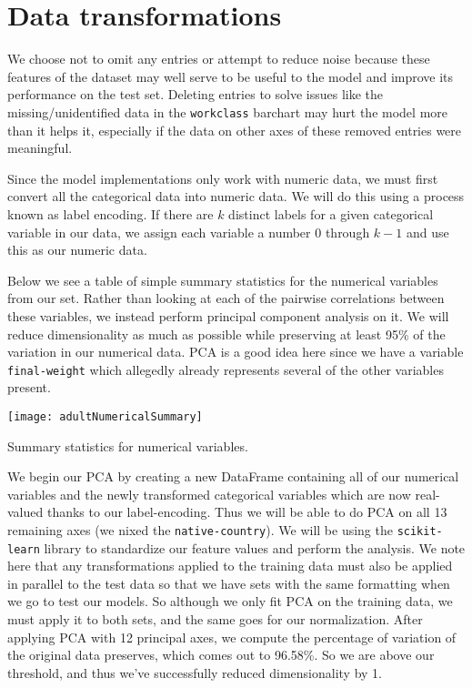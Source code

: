 \documentclass[11pt,oneside,reqno]{amsart}
\theoremstyle{plain}
\theoremstyle{definition}
\theoremstyle{remark}
\newcommand{\inlinecode}{\texttt}
\begin{document}
\section{Data transformations}

We choose not to omit any entries or attempt to reduce noise because these features of the dataset may well serve to be useful to the model and improve its performance on the test set. Deleting entries to solve issues like the missing/unidentified data in the \inlinecode{workclass} barchart may hurt the model more than it helps it, especially if the data on other axes of these removed entries were meaningful. 





Since the model implementations only work with numeric data, we must first convert all the categorical data into numeric data. We will do this using a process known as label encoding. If there are $k$ distinct labels for a given categorical variable in our data, we assign each variable a number 0 through $k - 1$ and use this as our numeric data. 




Below we see a table of simple summary statistics for the numerical variables from our set. Rather than looking at each of the pairwise correlations between these variables, we instead perform principal component analysis on it. We will reduce dimensionality as much as possible while preserving at least 95\% of the variation in our numerical data. PCA is a good idea here since we have a variable \inlinecode{final-weight} which allegedly already represents several of the other variables present. 

\begin{table}[H]
\begin{adjustbox}{center}
\texttt{[image: adultNumericalSummary]}
\end{adjustbox}
\caption{Summary statistics for numerical variables.}
\end{table}

We begin our PCA by creating a new DataFrame containing all of our numerical variables and the newly transformed categorical variables which are now real-valued thanks to our label-encoding. Thus we will be able to do PCA on all 13 remaining axes (we nixed the \inlinecode{native-country}). We will be using the \inlinecode{scikit-learn} library to standardize our feature values and perform the analysis. We note here that any transformations applied to the training data must also be applied in parallel to the test data so that we have sets with the same formatting when we go to test our models. So although we only fit PCA on the training data, we must apply it to both sets, and the same goes for our normalization. After applying PCA with 12 principal axes, we compute the percentage of variation of the original data preserves, which comes out to 96.58\%. So we are above our threshold, and thus we've successfully reduced dimensionality by 1. 
\end{document}

